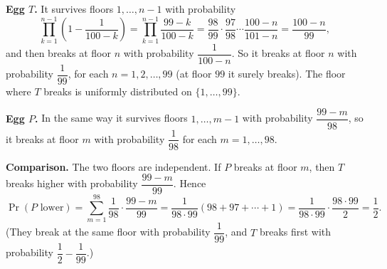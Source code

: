\textbf{Egg $T$.} It survives floors $1,\dots,n-1$ with probability
\[\prod_{k=1}^{n-1}\left(1-\dfrac{1}{100-k}\right)=\prod_{k=1}^{n-1}\dfrac{99-k}{100-k}=\dfrac{98}{99}\cdot\dfrac{97}{98}\cdots\dfrac{100-n}{101-n}=\dfrac{100-n}{99},\]
and then breaks at floor $n$ with probability $\dfrac{1}{100-n}$. So it breaks at floor $n$ with probability $\dfrac{1}{99}$, for each $n=1,2,\dots,99$ (at floor $99$ it surely breaks). The floor where $T$ breaks is uniformly distributed on $\{1,\dots,99\}$.

\textbf{Egg $P$.} In the same way it survives floors $1,\dots,m-1$ with probability $\dfrac{99-m}{98}$, so it breaks at floor $m$ with probability $\dfrac1{98}$ for each $m=1,\dots,98$.

\textbf{Comparison.} The two floors are independent. If $P$ breaks at floor $m$, then $T$ breaks higher with probability $\dfrac{99-m}{99}$. Hence
\[\Pr(P\text{ lower})=\sum_{m=1}^{98}\dfrac1{98}\cdot\dfrac{99-m}{99}=\dfrac{1}{98\cdot99}\left(98+97+\cdots+1\right)=\dfrac{1}{98\cdot99}\cdot\dfrac{98\cdot99}{2}=\boxed{\dfrac12}.\]
(They break at the same floor with probability $\dfrac1{99}$, and $T$ breaks first with probability $\dfrac12-\dfrac1{99}$.)
